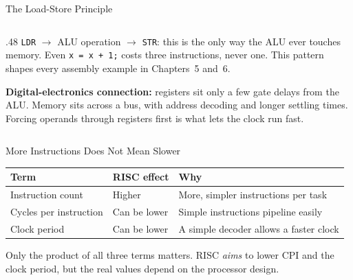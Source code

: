 \documentclass[9pt,aspectratio=169,xcolor=table]{beamer}
\begin{document}
\begin{frame}{The Load-Store Principle}
\begin{columns}[c]
\begin{column}{.48\textwidth}
        \vspace{3mm}
        {\small \texttt{LDR} $\to$ ALU operation $\to$ \texttt{STR}: this is the \alert{only} way the ALU ever touches memory. Even \texttt{x = x + 1;} costs \alert{three} instructions, never one. This pattern shapes every assembly example in Chapters~5 and~6.}

        \vspace{3mm}
        {\small \textbf{Digital-electronics connection:} registers sit only a few gate delays from the ALU. Memory sits across a bus, with address decoding and longer settling times. Forcing operands through registers first is what lets the clock run fast.}
    \end{column}
    \end{columns}
\end{frame}

\begin{frame}{More Instructions Does Not Mean Slower}
    \begin{center}
    \end{center}
    \vspace{4mm}
    \begin{center}
    {\small
    \striped
    \begin{tabular}{@{}l l l@{}}
        \toprule
        \textbf{Term} & \textbf{RISC effect} & \textbf{Why} \\
        \midrule
        Instruction count & \alert{Higher} & More, simpler instructions per task \\
        Cycles per instruction & \alert{Can be lower} & Simple instructions pipeline easily \\
        Clock period & \alert{Can be lower} & A simple decoder allows a faster clock \\
        \bottomrule
    \end{tabular}}
    \end{center}
    \vspace{3mm}
    {\small Only the product of all three terms matters. RISC \emph{aims} to lower CPI and the clock period, but the real values depend on the processor design.}
\end{frame}
\end{document}
